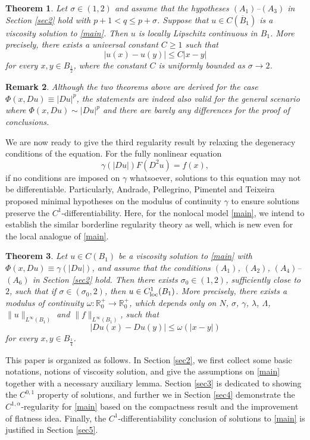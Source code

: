 \documentclass[11pt,reqno]{amsart}
\numberwithin{equation}{section}
\newtheorem{theorem}{Theorem}[section]
\newtheorem{remark}[theorem]{Remark}
\begin{document}
\begin{theorem}
\label{thm2}
Let $\sigma\in(1,2)$ and assume that the hypotheses $(A_1)$--$(A_3)$ in Section \ref{sec2} hold with $p+1< q\le p+\sigma$.
Suppose that $u\in C(\overline{B}_1)$ is a viscosity solution to \eqref{main}. Then $u$ is locally Lipschitz continuous in $B_1$.
More precisely, there exists a universal constant $C\ge1$ such that
$$
|u(x)-u(y)|\le C|x-y|
$$
for every $x,y\in B_{\frac12}$, where the constant $C$ is uniformly bounded as $\sigma\rightarrow2$.
\end{theorem}

\begin{remark}
Although the two theorems above are derived for the case $\Phi(x, Du)\equiv|Du|^p$, the statements are indeed also valid for the general scenario where $\Phi(x,Du)\sim|Du|^p$ and there are barely any differences for the proof of conclusions.
\end{remark}

We are now ready to give the third regularity result by relaxing the degeneracy conditions of the equation. For the fully nonlinear equation
$$
\gamma(|Du|)F(D^2u)=f(x),
$$
if no conditions are imposed on $\gamma$ whatsoever, solutions to this equation may not be differentiable. Particularly, Andrade, Pellegrino, Pimentel and Teixeira \cite{APPT22} proposed minimal hypotheses on the modulus of continuity $\gamma$ to ensure solutions preserve the $C^1$-differentiability. Here, for the nonlocal model \eqref{main}, we intend to establish the similar borderline regularity theory as well, which is new even for the local analogue of \eqref{main}.

\begin{theorem}
\label{thm3}
Let $u\in C(B_1)$ be a viscosity solution to \eqref{main} with $\Phi(x,Du)\equiv \gamma(|Du|)$, and assume that the conditions $(A_1)$, $(A_2)$, $(A_4)$--$(A_6)$ in Section \ref{sec2} hold. Then there exists $\sigma_0\in(1,2)$, sufficiently close to $2$, such that if $\sigma\in(\sigma_0, 2)$, then $u\in C^1_{\rm loc}(B_1)$. More precisely, there exists a modulus of continuity $\omega:\mathbb{R}^+_0\rightarrow\mathbb{R}^+_0$, which depends only on $N$, $\sigma$, $\gamma$, $\lambda$, $\Lambda$, $\|u\|_{L^\infty(B_1)}$ and $\|f\|_{L^\infty(B_1)}$, such that
$$
|Du(x)-Du(y)|\le \omega(|x-y|)
$$
for every $x,y\in B_{\frac14}$.
\end{theorem}

This paper is organized as follows. In Section \ref{sec2}, we first collect some basic notations, notions of viscosity solution, and give the assumptions on \eqref{main} together with a necessary auxiliary lemma. Section \ref{sec3} is dedicated to showing the $C^{0,1}$ property of solutions, and further we in Section \ref{sec4} demonstrate the $C^{1,\alpha}$-regularity for \eqref{main} based on the compactness result and the improvement of flatness idea. Finally, the $C^1$-differentiability conclusion of solutions to \eqref{main} is justified in Section \ref{sec5}.
\end{document}
